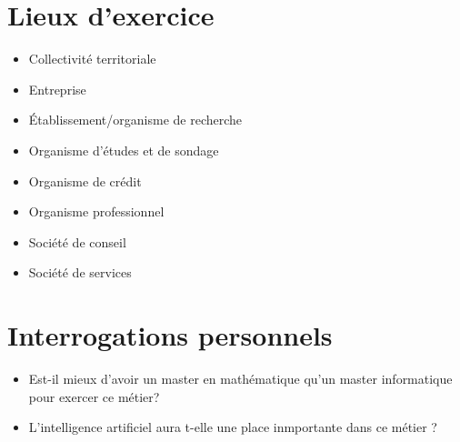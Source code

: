 \newpagepp

\section{Lieux d'exercice}
\begin{itemize}
\item Collectivité territoriale
\item Entreprise
\item Établissement/organisme de recherche
\item Organisme d'études et de sondage
\item Organisme de crédit
\item Organisme professionnel
\item Société de conseil
\item Société de services
\end{itemize}

\section{Interrogations personnels}
\begin{itemize}
\item Est-il mieux d'avoir un master en mathématique qu'un master informatique pour exercer ce métier?
\item L'intelligence artificiel aura t-elle une place inmportante dans ce métier ?
\end{itemize}
